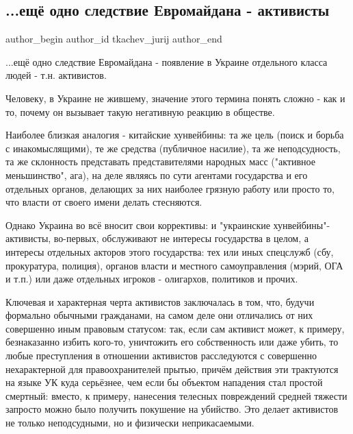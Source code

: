  
 
 
 
 
\subsection{...ещё одно следствие Евромайдана - активисты}
\label{sec:20_11_2021.tg.tkachev_jurij.1.maidan_aktivisty}


\ifcmt
 author_begin
   author_id tkachev_jurij
 author_end
\fi

...ещё одно следствие Евромайдана - появление в Украине отдельного класса людей
- т.н. активистов. 

Человеку, в Украине не жившему, значение этого термина понять сложно - как и
то, почему он вызывает такую негативную реакцию в обществе.

Наиболее близкая аналогия - китайские хунвейбины: та же цель (поиск и борьба с
инакомыслящими), те же средства (публичное насилие), та же неподсудность, та же
склонность представать представителями народных масс ("активное меньшинство",
ага), на деле являясь по сути агентами государства и его отдельных органов,
делающих за них наиболее грязную работу или просто то, что власти от своего
имени делать стесняются. 

Однако Украина во всё вносит свои коррективы: и "украинские
хунвейбины"-активисты, во-первых, обслуживают не интересы государства в целом,
а интересы отдельных акторов этого государства: тех или иных спецслужб (сбу,
прокуратура, полиция), органов власти и местного самоуправления (мэрий, ОГА и
т.п.) или даже отдельных игроков - олигархов, политиков и прочих.

Ключевая и характерная черта активистов заключалась в том, что, будучи
формально обычными гражданами, на самом деле они отличались от них совершенно
иным правовым статусом: так, если сам активист может, к примеру, безнаказанно
избить кого-то, уничтожить его собственность или даже убить, то любые
преступления в отношении активистов расследуются с совершенно нехарактерной для
правоохранителей прытью, причём действия эти трактуются на языке УК куда
серьёзнее, чем если бы объектом нападения стал простой смертный: вместо, к
примеру, нанесения телесных повреждений средней тяжести запросто можно было
получить покушение на убийство. Это делает активистов не только неподсудными,
но и физически неприкасаемыми.

